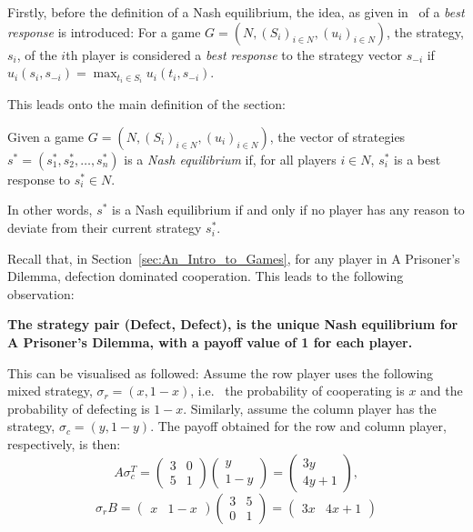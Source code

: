 Firstly, before the definition of a Nash equilibrium, the idea, as given 
in~\cite{maschler_solan_zamir_2013} of a \textit{best response} is introduced:
For a game \(G=(N, (S_{i})_{i \in N}, (u_{i})_{i \in N})\), the strategy,
\(s_{i}\), of the \(i\)th player is considered a \textit{best response} to the
strategy vector \(s_{-i}\) if \(u_{i}(s_{i}, s_{-i}) = \max_{t_{i} \in
S_{i}}u_{i}(t_{i}, s_{-i})\).

This leads onto the main definition of the section:
\begin{definition}\label{def:NE}
    Given a game \(G=(N, (S_{i})_{i \in N}, (u_{i})_{i \in N})\), the vector of
    strategies \(s^{*} = (s_{1}^{*}, s_{2}^{*}, \ldots, s_{n}^{*})\) is a
    \textit{Nash equilibrium} if, for all players \(i \in N\), \(s_{i}^{*}\) is 
    a best response to \(s_{i}^{*} \in N\).~\cite{maschler_solan_zamir_2013}
\end{definition}
In other words, \(s^{*}\) is a Nash equilibrium if and only if no player has any
reason to deviate from their current strategy \(s_{i}^{*}\).

Recall that, in Section~\ref{sec:An_Intro_to_Games}, for any player in A
Prisoner's Dilemma, defection dominated cooperation. This leads to the following
observation:
\begin{center}
    \textbf{The strategy pair (Defect, Defect), is the unique Nash equilibrium 
    for A Prisoner's Dilemma, with a payoff value of 1 for each player.}~\cite{maschler_solan_zamir_2013}
\end{center}
This can be visualised as followed:
Assume the row player uses the following mixed strategy, \(\sigma_{r} = (x,
1-x)\), i.e. \ the probability of cooperating is \(x\) and the probability of
defecting is \(1-x\). Similarly, assume the column player has 
the strategy, \(\sigma_{c} = (y, 1-y)\). The payoff obtained for the row and column player, respectively, is then:
\[
    A\sigma_{c}^T = \begin{pmatrix}
        3 & 0 \\
        5 & 1
    \end{pmatrix} \begin{pmatrix}
        y \\
        1-y
    \end{pmatrix} = \begin{pmatrix}
        3y \\
        4y + 1
    \end{pmatrix},
\]
\[
    \sigma_{r}B = \begin{pmatrix}
        x & 1-x
    \end{pmatrix} \begin{pmatrix}
        3 & 5 \\
        0 & 1        
    \end{pmatrix}  = \begin{pmatrix}
        3x & 4x + 1
    \end{pmatrix}
\]

